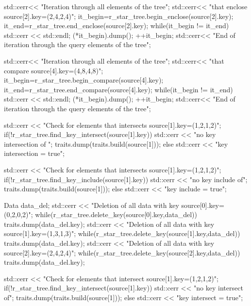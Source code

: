 \begin{cprog}
{  std::cerr<< "Iteration through all elements of the tree\n";
  std::cerr<< "that enclose source[2].key=(2,4,2,4)\n";
  it_begin=r_star_tree.begin_enclose(source[2].key);
  it_end=r_star_tree.end_enclose(source[2].key);
  while(it_begin != it_end){
    std::cerr << std::endl;
    (*it_begin).dump();
    ++it_begin;
  }
  std::cerr<< "End of iteration through the query elements of the tree\n";

  std::cerr<< "Iteration through all elements of the tree\n";
  std::cerr<< "that compare source[4].key=(4,8,4,8)\n";
  it_begin=r_star_tree.begin_compare(source[4].key);
  it_end=r_star_tree.end_compare(source[4].key);
  while(it_begin != it_end){
    std::cerr << std::endl;
    (*it_begin).dump();
    ++it_begin;
  }
  std::cerr<< "End of iteration through the query elements of the tree\n";

  std::cerr << "Check for elements that intersects source[1].key=(1,2,1,2)\n";
  if(!r_star_tree.find_key_intersect(source[1].key))
    {
      std::cerr << "no key intersection of "; 
      traits.dump(traits.build(source[1]));
    }
  else
    std::cerr << "key intersection = true";

  std::cerr << "Check for elements that intersects source[1].key=(1,2,1,2)\n";
  if(!r_star_tree.find_key_include(source[1].key))
    {
      std::cerr << "no key include of"; 
      traits.dump(traits.build(source[1]));
    }
  else
    std::cerr << "key include = true";

  Data data_del;
  std::cerr << "Deletion of all data with key source[0].key=(0,2,0,2)\n";
  while(r_star_tree.delete_key(source[0].key,data_del))
    traits.dump(data_del.key);
  std::cerr << "Deletion of all data with key source[1].key=(1,3,1,3)\n";
  while(r_star_tree.delete_key(source[1].key,data_del))
    traits.dump(data_del.key);
  std::cerr << "Deletion of all data with key source[2].key=(2,4,2,4)\n";
  while(r_star_tree.delete_key(source[2].key,data_del))
    traits.dump(data_del.key);

  std::cerr << "Check for elements that intersect source[1].key=(1,2,1,2)\n";
  if(!r_star_tree.find_key_intersect(source[1].key))
    {
      std::cerr << "no key intersect of"; 
      traits.dump(traits.build(source[1]));
    }
  else
    std::cerr << "key intersect = true";
}
\end{cprog}
%
%
%
%


